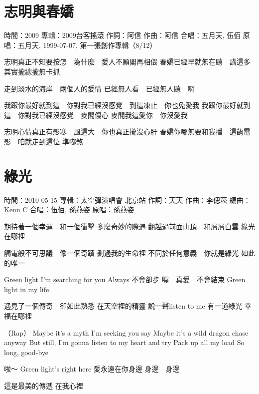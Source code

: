 \documentclass[UTF8,a4paper,oneside,twocolumn,12pt]{ctexbook}
\newcommand{\infopair}[2]{\textbullet #1：#2}
\newcommand{\zc}[1][伍佰]{\infopair{作詞}{#1}}
\newcommand{\zq}[1][伍佰]{\infopair{作曲}{#1}}
\newcommand{\bq}[1][伍佰]{\infopair{編曲}{#1}}
\newcommand{\zj}[1]{\infopair{專輯}{#1}}
\newcommand{\yc}[1]{\infopair{原唱}{#1}}
\newcommand{\sj}[1]{\infopair{時間}{#1}}
\newenvironment{info}{\begin{flushleft}\kaishu
	}
	{\end{flushleft}\normalsize\yahei\par}
\newenvironment{lyric}{
	}
{}
\begin{document}
\section{志明與春嬌}
\begin{info}
	\sj{2009}
	\zj{2009台客搖滾}
	\zc[阿信]
	\zq[阿信]
	\infopair{合唱}{五月天, 伍佰}
	\yc{五月天, 1999-07-07, 第一張創作專輯（8/12）}
\end{info}
\begin{lyric}
	志明真正不知要按怎　為什麼　愛人不願閣再相偎
	春嬌已經早就無在聽　講這多　其實攏總攏無卡抓

	走到淡水的海岸　兩個人的愛情
	已經無人看　已經無人聽　啊

	我跟你最好就到這　你對我已經沒感覺　到這凍止　你也免愛我
	我跟你最好就到這　你對我已經沒感覺　麥閣傷心
	麥閣我這愛你　你沒愛我

	志明心情真正有影寒　風這大　你也真正攏沒心肝
	春嬌你哪無要和我播　這齣電影　咱就走到這位  準嘟煞
\end{lyric}

\section{綠光}
\begin{info}
	\sj{2010-05-15}
	\zj{太空彈演唱會 北京站}
	\zc[天天]
	\zq[李偲菘]
	\bq[Kenn C]
	\infopair{合唱}{伍佰, 孫燕姿}
	\yc{孫燕姿}
\end{info}
\begin{lyric}
	期待著一個幸運　和一個衝擊
	多麼奇妙的際遇
	翻越過前面山頂　和層層白雲
	綠光在哪裡

	觸電般不可思議　像一個奇蹟
	劃過我的生命裡
	不同於任何意義　你就是綠光
	如此的唯一

	Green light   I'm searching for you
	Always   不會卻步
	喔　真愛　不會結束
	Green light in my life

	遇見了一個傳奇　卻如此熟悉
	在天空裡的精靈
	說一聲listen to me 有一道綠光
	幸福在哪裡

	（Rap）
	Maybe it's a myth I'm seeking you say
	Maybe it's a wild dragon chase anyway
	But still, I'm gonna listen to my heart and try
	Pack up all my load
	So long, good-bye

	啦～
	Green light's right here
	愛永遠在你身邊
	身邊　身邊

	這是最美的傳遞
	在我心裡

\end{lyric}
\end{document}
